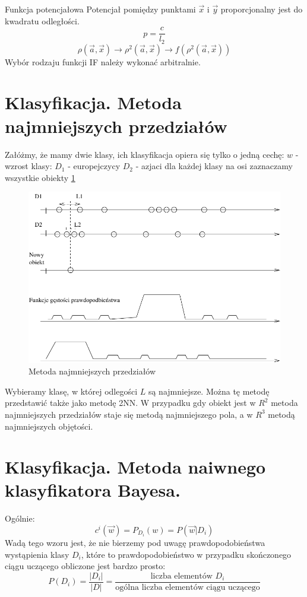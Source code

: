 \documentclass[a4paper,10pt]{article}
\begin{document}
Funkcja potencjałowa
Potencjał pomiędzy punktami $\overrightarrow{x}$ i $\overrightarrow{y}$ proporcjonalny jest do kwadratu odległości.
\begin{equation}
p = \frac{c}{l_2}
\end{equation}
\begin{equation}
\rho(\overrightarrow{a}, \overrightarrow{x}) \rightarrow \rho^2(\overrightarrow{a}, \overrightarrow{x}) \rightarrow f(\rho^2(\overrightarrow{a}, \overrightarrow{x}))
\end{equation}
Wybór rodzaju funkcji IF należy wykonać arbitralnie.

\section{Klasyfikacja. Metoda najmniejszych przedziałów}
Załóżmy, że mamy dwie klasy, ich klasyfikacja opiera się tylko o jedną cechę:
$w$ - wzrost
klasy:
$D_1$ - europejczycy
$D_2$ - azjaci
dla każdej klasy na osi zaznaczamy wszystkie obiekty \ref{fig:min_dist}
\begin{figure}[h]
  \centering
  \includegraphics[width=\textwidth]{min_przed.pdf}
  \caption{Metoda najmniejszych przedziałów}
  \label{fig:min_dist}
\end{figure}

Wybieramy klasę, w której odlegości $L$ są najmniejsze. Można tę metodę przedstawić także jako metodę 2NN.
W przypadku gdy obiekt jest w $R^2$ metoda najmniejszych przedziałów staje się metodą najmniejszego pola, a w $R^3$ metodą najmniejszych objętości.

\section{Klasyfikacja. Metoda naiwnego klasyfikatora Bayesa.}
Ogólnie:
\begin{equation}
c^i(\overrightarrow{w})=P_{D_i}(w)=P(\overrightarrow{w}|D_i)
\end{equation}
Wadą tego wzoru jest, że nie bierzemy pod uwagę prawdopodobieństwa wystąpienia klasy $D_i$, które to prawdopodobieństwo w przypadku skończonego ciągu uczącego obliczone jest bardzo prosto:
\begin{equation}
P(D_i)=\frac{|D_i|}{|D|}=\frac{\mbox{liczba elementów $D_i$}}{\mbox{ogólna liczba elementów ciągu uczącego}}
\end{equation}
\end{document}
